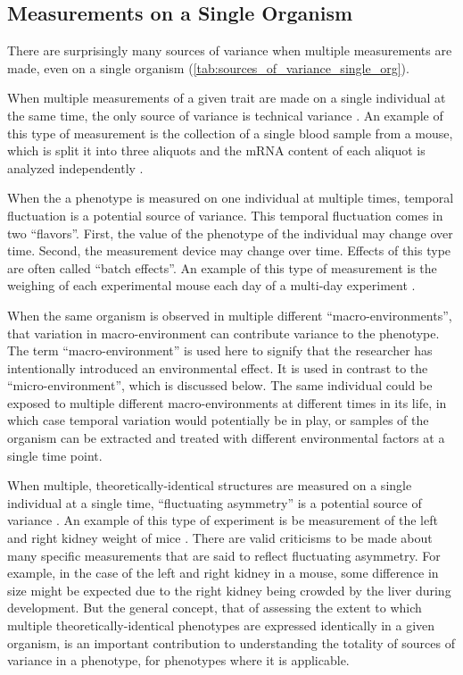 \subsection{Measurements on a Single Organism}

There are surprisingly many sources of variance when multiple measurements are made, even on a single organism (\autoref{tab:sources_of_variance_single_org}).

When multiple measurements of a given trait are made on a single individual at the same time, the only source of variance is technical variance \citep{Ronnegard2011a}.
An example of this type of measurement is the collection of a single blood sample from a mouse, which is split it into three aliquots and the mRNA content of each aliquot is analyzed independently \citep{Marioni2008}.

When the a phenotype is measured on one individual at multiple times, temporal fluctuation is a potential source of variance.
This temporal fluctuation comes in two ``flavors''.
First, the value of the phenotype of the individual may change over time.
Second, the measurement device may change over time.
Effects of this type are often called ``batch effects''.
An example of this type of measurement is the weighing of each experimental mouse each day of a multi-day experiment \citep{Gray2015}.

When the same organism is observed in multiple different ``macro-environments'', that variation in macro-environment can contribute variance to the phenotype.
The term ``macro-environment'' is used here to signify that the researcher has intentionally introduced an environmental effect.
It is used in contrast to the ``micro-environment'', which is discussed below.
The same individual could be exposed to multiple different macro-environments at different times in its life, in which case temporal variation would potentially be in play, or samples of the organism can be extracted and treated with different environmental factors at a single time point.

When multiple, theoretically-identical structures are measured on a single individual at a single time, ``fluctuating asymmetry'' is a potential source of variance \citep{Palmer1986}.
An example of this type of experiment is be measurement of the left and right kidney weight of mice \citep{Leamy2000,Leamy2002}.
There are valid criticisms to be made about many specific measurements that are said to reflect fluctuating asymmetry.
For example, in the case of the left and right kidney in a mouse, some difference in size might be expected due to the right kidney being crowded by the liver during development.
But the general concept, that of assessing the extent to which multiple theoretically-identical phenotypes are expressed identically in a given organism, is an important contribution to understanding the totality of sources of variance in a phenotype, for phenotypes where it is applicable.

